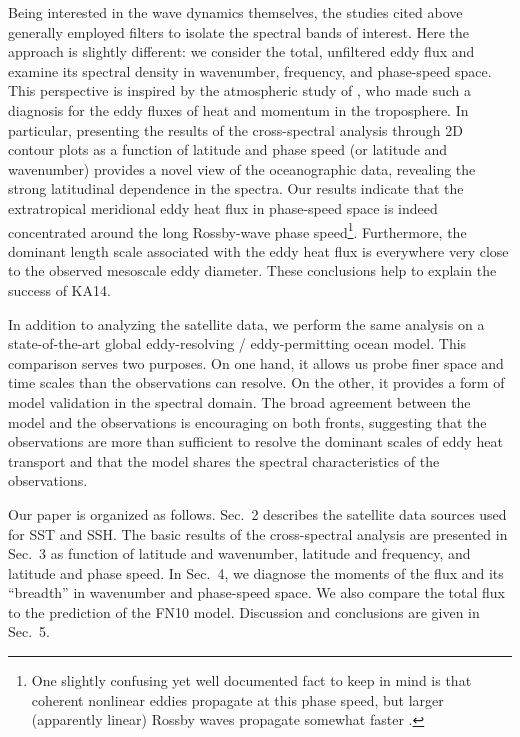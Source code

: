 \documentclass[10pt]{article}
\begin{document}
Being interested in the wave dynamics themselves, the studies cited above generally employed filters to isolate the spectral bands of interest. Here the approach is slightly different: we consider the total, unfiltered eddy flux and examine its spectral density in wavenumber, frequency, and phase-speed space. This perspective is inspired by the atmospheric study of \citet[][henceforth RH91]{RandelHeld1991}, who made such a diagnosis for the eddy fluxes of heat and momentum in the troposphere. In particular, presenting the results of the cross-spectral analysis through 2D contour plots as a function of latitude and phase speed (or latitude and wavenumber) provides a novel view of the oceanographic data, revealing the strong latitudinal dependence in the spectra. Our results indicate that the extratropical meridional eddy heat flux in phase-speed space is indeed concentrated around the long Rossby-wave phase speed\footnote{One slightly confusing yet well documented fact to keep in mind is  that coherent nonlinear eddies propagate at this phase speed, but larger (apparently linear) Rossby waves propagate somewhat faster \citep{CheltonEtAl2007,CheltonEtAl2011}.}. Furthermore, the dominant length scale associated with the eddy heat flux is everywhere very close to the observed mesoscale eddy diameter. These conclusions help to explain the success of KA14.

In addition to analyzing the satellite data, we perform the same analysis on a state-of-the-art global eddy-resolving / eddy-permitting ocean model. This comparison serves two purposes. On one hand, it allows us probe finer space and time scales than the observations can resolve. On the other, it provides a form of model validation in the spectral domain. The broad agreement between the model and the observations is encouraging on both fronts, suggesting that the observations are more than sufficient to resolve the dominant scales of eddy heat transport and that the model shares the spectral characteristics of the observations.


Our paper is organized as follows. Sec.~2 describes the satellite data sources used for SST and SSH. The basic results of the cross-spectral analysis are presented in Sec.~3 as function of latitude and wavenumber, latitude and frequency, and latitude and phase speed. In Sec.~4, we diagnose the moments of the flux and its ``breadth'' in wavenumber and phase-speed space. We also compare the total flux to the prediction of the FN10 model. Discussion and conclusions are given in Sec.~5.
\end{document}
